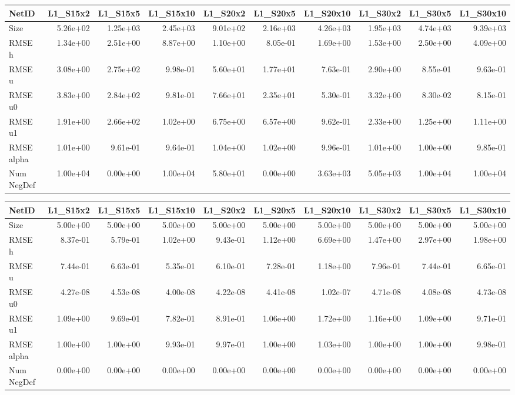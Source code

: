 \documentclass{article}
\theoremstyle{remark}
\numberwithin{equation}{subsection}
\begin{document}
\begin{tabular}{lrrrrrrrrr}
	\toprule
	NetID &  L1\_S15x2 &  L1\_S15x5 &  L1\_S15x10 &  L1\_S20x2 &  L1\_S20x5 &  L1\_S20x10 &  L1\_S30x2 &  L1\_S30x5 &  L1\_S30x10 \\
	\midrule
	Size       &  5.26e+02 &  1.25e+03 &   2.45e+03 &  9.01e+02 &  2.16e+03 &   4.26e+03 &  1.95e+03 &  4.74e+03 &   9.39e+03 \\
	RMSE h     &  1.34e+00 &  2.51e+00 &   8.87e+00 &  1.10e+00 &  8.05e-01 &   1.69e+00 &  1.53e+00 &  2.50e+00 &   4.09e+00 \\
	RMSE u     &  3.08e+00 &  2.75e+02 &   9.98e-01 &  5.60e+01 &  1.77e+01 &   7.63e-01 &  2.90e+00 &  8.55e-01 &   9.63e-01 \\
	RMSE u0    &  3.83e+00 &  2.84e+02 &   9.81e-01 &  7.66e+01 &  2.35e+01 &   5.30e-01 &  3.32e+00 &  8.30e-02 &   8.15e-01 \\
	RMSE u1    &  1.91e+00 &  2.66e+02 &   1.02e+00 &  6.75e+00 &  6.57e+00 &   9.62e-01 &  2.33e+00 &  1.25e+00 &   1.11e+00 \\
	RMSE alpha &  1.01e+00 &  9.61e-01 &   9.64e-01 &  1.04e+00 &  1.02e+00 &   9.96e-01 &  1.01e+00 &  1.00e+00 &   9.85e-01 \\
	Num NegDef &  1.00e+04 &  0.00e+00 &   1.00e+04 &  5.80e+01 &  0.00e+00 &   3.63e+03 &  5.05e+03 &  1.00e+04 &   1.00e+04 \\
	\bottomrule
\end{tabular}


\begin{tabular}{lrrrrrrrrr}
	\toprule
	NetID &  L1\_S15x2 &  L1\_S15x5 &  L1\_S15x10 &  L1\_S20x2 &  L1\_S20x5 &  L1\_S20x10 &  L1\_S30x2 &  L1\_S30x5 &  L1\_S30x10 \\
	\midrule
	Size       &  5.00e+00 &  5.00e+00 &   5.00e+00 &  5.00e+00 &  5.00e+00 &   5.00e+00 &  5.00e+00 &  5.00e+00 &   5.00e+00 \\
	RMSE h     &  8.37e-01 &  5.79e-01 &   1.02e+00 &  9.43e-01 &  1.12e+00 &   6.69e+00 &  1.47e+00 &  2.97e+00 &   1.98e+00 \\
	RMSE u     &  7.44e-01 &  6.63e-01 &   5.35e-01 &  6.10e-01 &  7.28e-01 &   1.18e+00 &  7.96e-01 &  7.44e-01 &   6.65e-01 \\
	RMSE u0    &  4.27e-08 &  4.53e-08 &   4.00e-08 &  4.22e-08 &  4.41e-08 &   1.02e-07 &  4.71e-08 &  4.08e-08 &   4.73e-08 \\
	RMSE u1    &  1.09e+00 &  9.69e-01 &   7.82e-01 &  8.91e-01 &  1.06e+00 &   1.72e+00 &  1.16e+00 &  1.09e+00 &   9.71e-01 \\
	RMSE alpha &  1.00e+00 &  1.00e+00 &   9.93e-01 &  9.97e-01 &  1.00e+00 &   1.03e+00 &  1.00e+00 &  1.00e+00 &   9.98e-01 \\
	Num NegDef &  0.00e+00 &  0.00e+00 &   0.00e+00 &  0.00e+00 &  0.00e+00 &   0.00e+00 &  0.00e+00 &  0.00e+00 &   0.00e+00 \\
	\bottomrule
\end{tabular}
\end{document}
